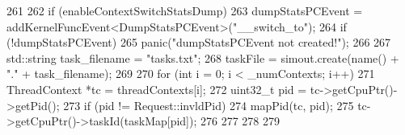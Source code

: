 \begin{DoxyCode}
261 {
262     if (enableContextSwitchStatsDump) {
263         dumpStatsPCEvent = addKernelFuncEvent<DumpStatsPCEvent>("__switch_to");
264         if (!dumpStatsPCEvent)
265            panic("dumpStatsPCEvent not created!");
266 
267         std::string task_filename = "tasks.txt";
268         taskFile = simout.create(name() + "." + task_filename);
269 
270         for (int i = 0; i < _numContexts; i++) {
271             ThreadContext *tc = threadContexts[i];
272             uint32_t pid = tc->getCpuPtr()->getPid();
273             if (pid != Request::invldPid) {
274                 mapPid(tc, pid);
275                 tc->getCpuPtr()->taskId(taskMap[pid]);
276             }
277         }
278     }
279 }
\end{DoxyCode}


